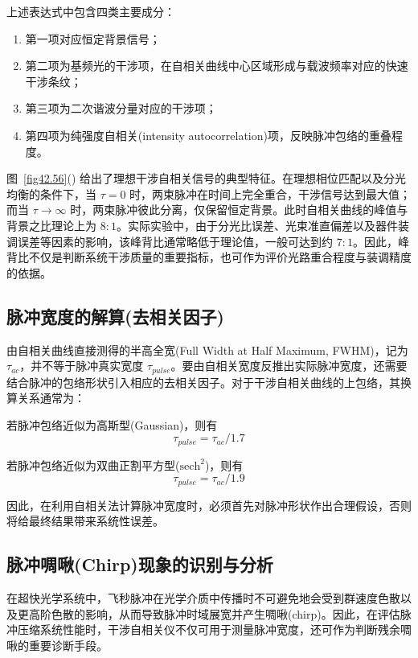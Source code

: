 上述表达式中包含四类主要成分：
\begin{enumerate}
    \item 第一项对应恒定背景信号；
    \item 第二项为基频光的干涉项，在自相关曲线中心区域形成与载波频率对应的快速干涉条纹；
    \item 第三项为二次谐波分量对应的干涉项；
    \item 第四项为纯强度自相关(intensity autocorrelation)项，反映脉冲包络的重叠程度。
\end{enumerate}

图~\ref{fig42.56}() 给出了理想干涉自相关信号的典型特征。在理想相位匹配以及分光均衡的条件下，当 $\tau=0$ 时，两束脉冲在时间上完全重合，干涉信号达到最大值；而当 $\tau \rightarrow \infty$ 时，两束脉冲彼此分离，仅保留恒定背景。此时自相关曲线的峰值与背景之比理论上为 $8:1$。实际实验中，由于分光比误差、光束准直偏差以及器件装调误差等因素的影响，该峰背比通常略低于理论值，一般可达到约 $7:1$。因此，峰背比不仅是判断系统干涉质量的重要指标，也可作为评价光路重合程度与装调精度的依据。


\subsection{脉冲宽度的解算(去相关因子)}\label{app:auto_deconv}

由自相关曲线直接测得的半高全宽(Full Width at Half Maximum, FWHM)，记为 $\tau_{ac}$，并不等于脉冲真实宽度 $\tau_{pulse}$。要由自相关宽度反推出实际脉冲宽度，还需要结合脉冲的包络形状引入相应的去相关因子。对于干涉自相关曲线的上包络，其换算关系通常为：

若脉冲包络近似为高斯型(Gaussian)，则有
\begin{equation}
\tau_{pulse}=\tau_{ac}/1.7
\end{equation}

若脉冲包络近似为双曲正割平方型($\mathrm{sech}^2$)，则有
\begin{equation}
\tau_{pulse}=\tau_{ac}/1.9
\end{equation}

因此，在利用自相关法计算脉冲宽度时，必须首先对脉冲形状作出合理假设，否则将给最终结果带来系统性误差。



\subsection{脉冲啁啾(Chirp)现象的识别与分析}\label{app:auto_chirp}

在超快光学系统中，飞秒脉冲在光学介质中传播时不可避免地会受到群速度色散以及更高阶色散的影响，从而导致脉冲时域展宽并产生啁啾(chirp)。因此，在评估脉冲压缩系统性能时，干涉自相关仪不仅可用于测量脉冲宽度，还可作为判断残余啁啾的重要诊断手段。

